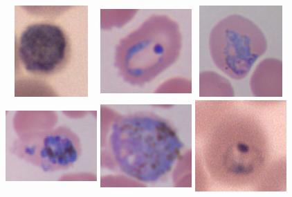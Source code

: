 \documentclass[final,a4paper,12pt,english]{UnicaPhdThesis3}
\begin{document}
{\begin{figure}[H]
	\includegraphics[width=3.5cm, height=3.5cm]{images/malaria/falciparum_4_gametocyte}
	\includegraphics[width=3.5cm, height=3.5cm]{images/malaria/ovale_1_ring}
	\includegraphics[width=3.5cm, height=3.5cm]{images/malaria/ovale_2_trophozoite}
	\includegraphics[width=3.5cm, height=3.5cm]{images/malaria/ovale_3_schizont}
	\includegraphics[width=3.5cm, height=3.5cm]{images/malaria/ovale_4_gametocyte}
	\includegraphics[width=3.5cm, height=3.5cm]{images/malaria/malariae_1_ring}

\end{figure}}
\end{document}
